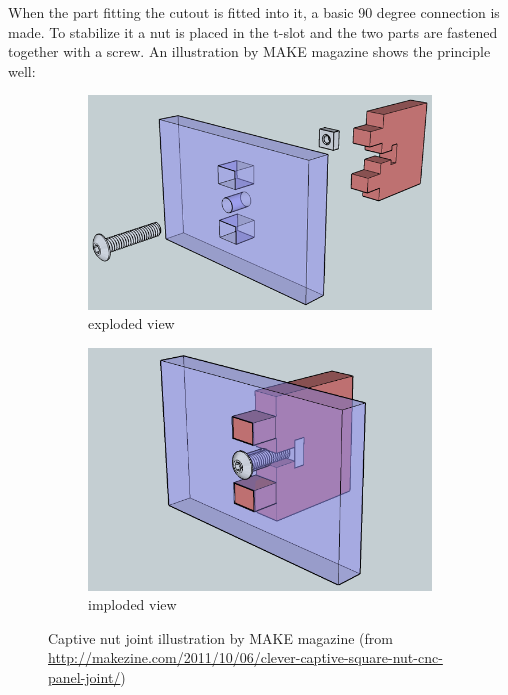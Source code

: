 When the part fitting the cutout is fitted into it, a basic 90 degree connection is made. To stabilize it a nut is placed in the t-slot and the two parts are fastened together with a screw. An illustration by MAKE magazine shows the principle well:
 
\begin{figure}[H]
  \centering
  \begin{subfigure}{0.48\textwidth}
  \centering
  \includegraphics[width=0.9\linewidth]{images/captive-square-nut-joint-exploded.png}
  \caption{exploded view}
  \end{subfigure}
  \begin{subfigure}{0.48\textwidth}
  \centering
  \includegraphics[width=0.9\linewidth]{images/captive-square-nut-joint-imploded.png}
  \caption{imploded view}
  \end{subfigure}
  \caption{Captive nut joint illustration by MAKE magazine (from \url{http://makezine.com/2011/10/06/clever-captive-square-nut-cnc-panel-joint/})}
\end{figure} 
 
